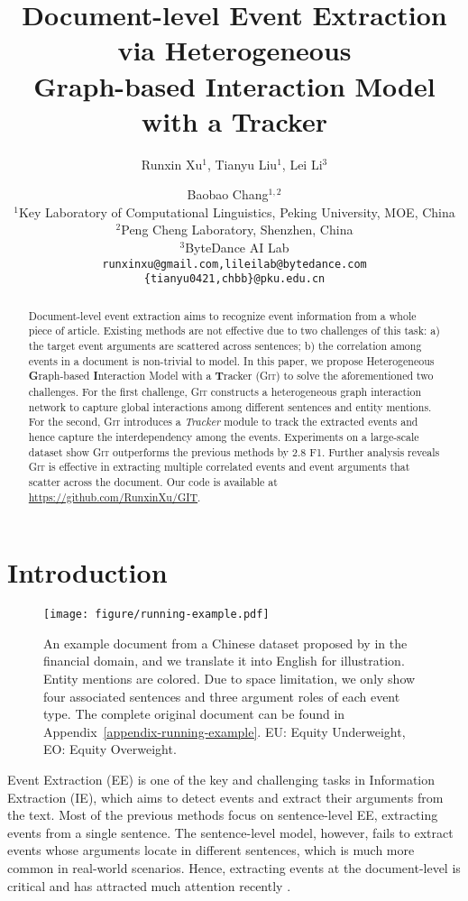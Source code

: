 \documentclass[11pt,a4paper]{article}
\title{Document-level Event Extraction via Heterogeneous \\ Graph-based Interaction Model with a Tracker}
\author{
  Runxin Xu$^{1}$, 
  Tianyu Liu$^{1}$, 
  Lei Li$^{3}$ \and
  Baobao Chang$^{1,2}$\footnotemark[1]
  \\
  $^{1}$Key Laboratory of Computational Linguistics, Peking University, MOE, China\\
  $^{2}$Peng Cheng Laboratory, Shenzhen, China\\
  $^{3}$ByteDance AI Lab\\
  \texttt{
     runxinxu@gmail.com,lileilab@bytedance.com
  } \\
  \texttt{
     \{tianyu0421,chbb\}@pku.edu.cn
  }
}
\date{}
\newcommand{\modelname}{\textsc{Git}\xspace}
\begin{document}
\maketitle

\renewcommand{\thefootnote}{\fnsymbol{footnote}} 

\begin{abstract}

Document-level event extraction aims to recognize event information from a whole piece of article.
Existing methods are not effective due to two challenges of this task: a) the target event arguments are scattered across sentences; b) the correlation among events in a document is non-trivial to model.
In this paper, we propose Heterogeneous \textbf{G}raph-based \textbf{I}nteraction Model with a \textbf{T}racker (\modelname) to solve the aforementioned two challenges.
For the first challenge, \modelname constructs a heterogeneous graph interaction network to capture global interactions among different sentences and entity mentions.
For the second, \modelname introduces a \textit{Tracker} module to track the extracted events and hence capture the interdependency among the events.
Experiments on a large-scale dataset  \citep{zheng-etal-2019-doc2edag} show \modelname outperforms the previous methods by 2.8 F1.
Further analysis reveals \modelname is effective in extracting multiple correlated events and event arguments that scatter across the document.
Our code is available at \url{https://github.com/RunxinXu/GIT}.

\end{abstract} \section{Introduction}
\begin{figure}
    \centering
    \texttt{[image: figure/running-example.pdf]}
    \caption{An example document from a Chinese dataset proposed by \citet{zheng-etal-2019-doc2edag} in the financial domain, and we translate it into English for illustration. Entity mentions are colored. Due to space limitation, we only show four associated sentences and three argument roles of each event type. The complete original document can be found in Appendix~\ref{appendix-running-example}. EU: Equity Underweight, EO: Equity Overweight.}
    \label{fig:running-example}
\end{figure}

Event Extraction (EE) is one of the key and challenging tasks in Information Extraction (IE), which aims to detect events and extract their arguments from the text.
Most of the previous methods \citep{ chen-etal-2015-event, nguyen-etal-2016-joint, liu-etal-2018-jointly, yang-etal-2019-exploring-pre, du-cardie-2020-event} focus on sentence-level EE, extracting events from a single sentence.
The sentence-level model, however, fails to extract events whose arguments locate in different sentences, which is much more common in real-world scenarios.
Hence, extracting events at the document-level is critical and has attracted much attention recently \citep{yang-etal-2018-dcfee,zheng-etal-2019-doc2edag,du-cardie-2020-document, DBLP:journals/corr/abs-2008-09249}.
\end{document}
